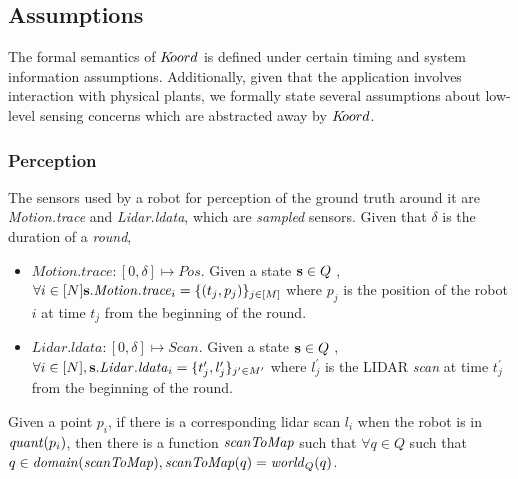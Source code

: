 \subsection{Assumptions}
\label{sec:formal:sensing}

The formal semantics of $K\kern-2pt oord$ is defined under certain timing and system information assumptions. Additionally, given that the application involves interaction with physical plants, we formally state several assumptions about low-level sensing concerns which are abstracted away by $K\kern-2pt oord$.

\subsubsection{Perception}





The sensors used by a robot for perception of the ground truth around it are \emph{Motion.trace} and \emph{Lidar.ldata}, which are \emph{sampled} sensors. Given that $\delta$ is the duration of a \emph{round},

\begin{itemize}
    \item $\mathit{Motion.trace}: [0,\delta] \mapsto \mathit{Pos}$. Given a state ${\textbf{s}}\in Q$ ,  $\forall i \in [N]{\textbf{s}}.\mathit{Motion.trace}_i = \{(t_j, p_j)\}_{j \in [M]}$ where $p_j$ is the position of the robot $i$ at time $t_j$ from the beginning of the round.
    \item  $\mathit{Lidar.ldata} : [0,\delta]\mapsto \mathit{Scan}$. Given a state ${\textbf{s}}\in Q$ , $\forall i \in [N], {\textbf{s}}.\mathit{Lidar.ldata}_i = \{t_j^\prime, l_j^\prime\}_{j^\prime \in M^\prime}$ where $l_j^\prime$ is the LIDAR \emph{scan} at time $t_j^\prime$ from the beginning of the round.
\end{itemize}

\begin{assumption}
    Given a point $p_i$, if there is a corresponding lidar scan $l_i$ when the robot is in $\mathit{quant}(p_i)$, then there is a function $\mathit{scanToMap}$ such that $\forall q\in Q$ such that $q \in \mathit{domain}(\mathit{scanToMap}), \mathit{scanToMap}(q) = \mathit{world}_Q(q)$.
\end{assumption}

